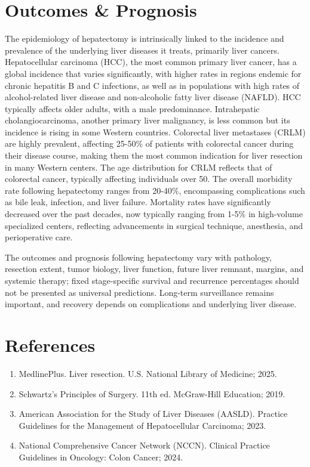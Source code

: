 \section*{Outcomes \& Prognosis}
The epidemiology of hepatectomy is intrinsically linked to the incidence and prevalence of the underlying liver diseases it treats, primarily liver cancers. Hepatocellular carcinoma (HCC), the most common primary liver cancer, has a global incidence that varies significantly, with higher rates in regions endemic for chronic hepatitis B and C infections, as well as in populations with high rates of alcohol-related liver disease and non-alcoholic fatty liver disease (NAFLD). HCC typically affects older adults, with a male predominance. Intrahepatic cholangiocarcinoma, another primary liver malignancy, is less common but its incidence is rising in some Western countries. Colorectal liver metastases (CRLM) are highly prevalent, affecting 25-50\% of patients with colorectal cancer during their disease course, making them the most common indication for liver resection in many Western centers. The age distribution for CRLM reflects that of colorectal cancer, typically affecting individuals over 50. The overall morbidity rate following hepatectomy ranges from 20-40\%, encompassing complications such as bile leak, infection, and liver failure. Mortality rates have significantly decreased over the past decades, now typically ranging from 1-5\% in high-volume specialized centers, reflecting advancements in surgical technique, anesthesia, and perioperative care.

The outcomes and prognosis following hepatectomy vary with pathology, resection extent, tumor biology, liver function, future liver remnant, margins, and systemic therapy; fixed stage-specific survival and recurrence percentages should not be presented as universal predictions. Long-term surveillance remains important, and recovery depends on complications and underlying liver disease.

\section*{References}
\begin{enumerate}
  \item MedlinePlus. Liver resection. U.S. National Library of Medicine; 2025.
  \item Schwartz's Principles of Surgery. 11th ed. McGraw-Hill Education; 2019.
  \item American Association for the Study of Liver Diseases (AASLD). Practice Guidelines for the Management of Hepatocellular Carcinoma; 2023.
  \item National Comprehensive Cancer Network (NCCN). Clinical Practice Guidelines in Oncology: Colon Cancer; 2024.
\end{enumerate}

\clearpage
